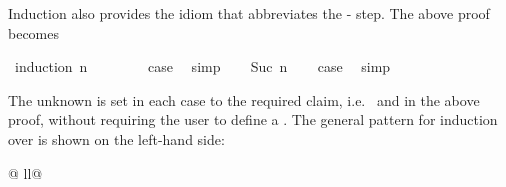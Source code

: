 \begin{isabellebody}
\begin{isamarkuptext}
Induction also provides the  idiom that abbreviates
the - step. The above proof becomes%
\end{isamarkuptext}%
\isamarkuptrue%
%
\isadelimproof
%
\endisadelimproof
%
\isatagproof
{}\isamarkupfalse%
\ {}induction\ n{}\isanewline
\ \ \isamarkupfalse%
\ {}\isanewline
\ \ \isamarkupfalse%
\ {}case\ \isamarkupfalse%
\ simp\isanewline
{}\isamarkupfalse%
\isanewline
\ \ \isamarkupfalse%
\ {}Suc\ n{}\isanewline
\ \ \isamarkupfalse%
\ {}case\ \isamarkupfalse%
\ simp\isanewline
{}\isamarkupfalse%
%
\endisatagproof
{\isafoldproof}%
%
\isadelimproof
%
\endisadelimproof
%
\begin{isamarkuptext}%
The unknown  is set in each case to the required
claim, i.e.\  and \mbox{} in the above proof,
without requiring the user to define a . The general
pattern for induction over  is shown on the left-hand side:%
\end{isamarkuptext}%
\isamarkuptrue%
%
\begin{tabular}{@ {}ll@ {}}
\begin{minipage}[t]{.4\textwidth}
\end{minipage}
\end{tabular}
\end{isabellebody}

